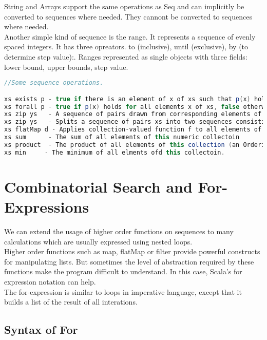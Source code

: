 \documentclass[10pt, a4paper]{report}
\begin{document}
String and Arrays support the same operations as Seq and can implicitly be converted to sequences where needed. They cannont be converted to sequences where needed.\\ 

Another simple kind of sequence is the range. It represents a sequence of evenly spaced integers. It has three opreators. to (inclusive), until (exclusive), by (to determine step value):. Ranges represented as single objects with three fields: lower bound, upper bounds, step value.\\


\begin{lstlisting}[language=scala]
//Some sequence operations.

xs exists p - true if there is an element of x of xs such that p(x) holds, false otherwise.
xs forall p - true if p(x) holds for all elements x of xs, false otherwise
xs zip ys   - A sequence of pairs drawn from corresponding elements of sequences xs and ys
xs zip ys   - Splits a sequence of pairs xs into two sequences consisting of the first, respectively second halves of all pairs.
xs flatMap d - Applies collection-valued function f to all elements of xs and concatenates the results
xs sum      - The sum of all elements of this numeric collectoin
xs product  - The product of all elements of this collection (an Ordering must exist)
xs min     - The minimum of all elments ofd this collectoin.


\end{lstlisting}


\section{Combinatorial Search and For-Expressions}

We can extend the usage of higher order functions on sequences to many calculations which are usually expressed using nested loops.\\ Higher order functions such as map, flatMap or filter provide powerful constructs for manipulating lists. But sometimes the level of abstraction required by these functions make the program difficult to understand.  In this case, Scala's for expression notation can help.\\ The for-expression is similar to loops in imperative language, except that it builds a list of the result of all interations.

\subsection{Syntax of For}
\end{document}
